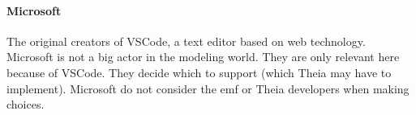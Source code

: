 \paragraph*{Microsoft}
The original creators of \gls{VSCode}, a text editor based on web technology.
Microsoft is not a big actor in the modeling world.
They are only relevant here because of \gls{VSCode}.
They decide which  to support (which \gls{Theia} may have to implement).
Microsoft do not consider the \acrshort{emf} or \gls{Theia} developers when  making choices. %
